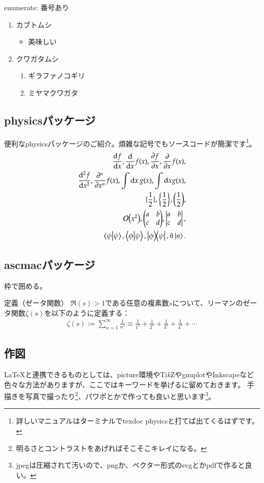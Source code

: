 \documentclass[11pt,b5paper,papersize,dvipdfmx]{jsbook}
\begin{document}
enumerate: 番号あり
\begin{enumerate}
  \item カブトムシ
  \begin{itemize}
    \item 美味しい
  \end{itemize}
  \item クワガタムシ
  \begin{enumerate}
      \item ギラファノコギリ
      \item ミヤマクワガタ
  \end{enumerate}
\end{enumerate}

%
\subsection{physicsパッケージ}
便利なphysicsパッケージのご紹介。煩雑な記号でもソースコードが簡潔です\footnote{詳しいマニュアルはターミナルで{\ttfamily texdoc physics}と打てば出てくるはずです。}。
\begin{align*}
  \dv{f}{x} (x), \dv{x} f(x), \pdv{f}{x} (x), \pdv{x} f(x),\\
  \dv[2]{f}{x} (x), \pdv[n]{x} f(x), \int \dd{x} g(x), \int \dd x g(x),\\
  \{ \frac12 \}, \qty{ \frac12 }, \qty( \frac12 ),\\
  \order{x^2}, \mqty(a & b \\ c & d), \mdet{a & b \\ c & d},\\
  \braket{\psi}, \braket{\phi}{\psi}, \ketbra{\phi}{\psi}, \hat n \ket{n}.
\end{align*}

%
\subsection{ascmacパッケージ}
枠で囲める。
\begin{itembox}[l]{定義（ゼータ関数）}
  $\Re(s) > 1$である任意の複素数$s$について、リーマンのゼータ関数$\zeta (s)$を以下のように定義する：
  \begin{align*}
    \zeta (s) := \sum_{n=1}^\infty \frac{1}{n^s}
    \equiv \frac{1}{1^s} + \frac{1}{2^s} + \frac{1}{3^s} + \frac{1}{4^s} + \cdots
  \end{align*}
\end{itembox}

%
\subsection{作図}
\LaTeX と連携できるものとしては、picture環境やTi{\itshape k}ZやgnuplotやInkscapeなど色々な方法がありますが、ここではキーワードを挙げるに留めておきます。
手描きを写真で撮ったり\footnote{明るさとコントラストをあげればそこそこキレイになる。}、パワポとかで作っても良いと思います\footnote{jpegは圧縮されて汚いので、pngか、ベクター形式のsvgとかpdfで作ると良い。}。
\end{document}
